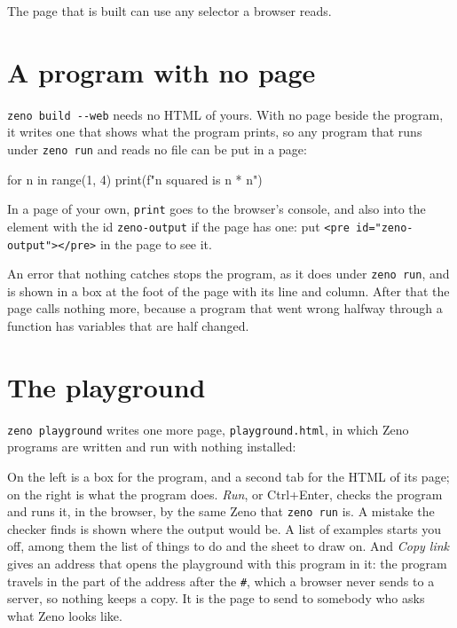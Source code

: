 The page that is built can use any selector a browser reads.

\section{A program with no page}

\verb|zeno build --web| needs no HTML of yours. With no page beside
the program, it writes one that shows what the program prints, so any
program that runs under \verb|zeno run| and reads no file can be put
in a page:

\begin{zeno}[file=hello.zeno, dir=hello, cmd=zeno build --web {file}]
for n in range(1, 4) {
    print(f"{n} squared is {n * n}")
}
\end{zeno}

In a page of your own, \verb|print| goes to the browser's console, and
also into the element with the id \verb|zeno-output| if the page has
one: put \verb|<pre id="zeno-output"></pre>| in the page to see it.

An error that nothing catches stops the program, as it does under
\verb|zeno run|, and is shown in a box at the foot of the page with its
line and column. After that the page calls nothing more, because a
program that went wrong halfway through a function has variables that
are half changed.

\section{The playground}

\verb|zeno playground| writes one more page, \verb|playground.html|,
in which Zeno programs are written and run with nothing installed:

\begin{zeno}[file=empty.zeno, dir=playground, show=no, cmd=zeno playground]
\end{zeno}

On the left is a box for the program, and a second tab for the HTML of
its page; on the right is what the program does. \emph{Run}, or
Ctrl+Enter, checks the program and runs it, in the browser, by the
same Zeno that \verb|zeno run| is. A mistake the checker finds is
shown where the output would be. A list of examples starts you off,
among them the list of things to do and the sheet to draw on. And
\emph{Copy link} gives an address that opens the playground with this
program in it: the program travels in the part of the address after
the \verb|#|, which a browser never sends to a server, so nothing keeps
a copy. It is the page to send to somebody who asks what Zeno looks
like.

